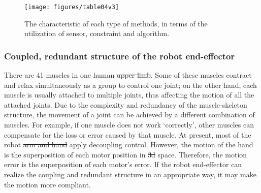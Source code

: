\documentclass[journal,twoside,web]{ieeecolor}
\providecommand{\DIFadd}[1]{{\protect\color{blue}\uwave{#1}}} %
\providecommand{\DIFdel}[1]{{\protect\color{red}\sout{#1}}}                      %
\providecommand{\DIFaddbegin}{} %
\providecommand{\DIFaddend}{} %
\providecommand{\DIFdelbegin}{} %
\providecommand{\DIFdelend}{} %
\newcommand{\DIFscaledelfig}{0.5}
\newlength{\DIFdelgraphicswidth} %
\newlength{\DIFdelgraphicsheight} %
\newcommand{\DIFaddincludegraphics}[2][]{{\color{blue}\fbox{\DIFOincludegraphics[#1]{#2}}}} %
\newcommand{\DIFdelincludegraphics}[2][]{%
\sbox{\DIFdelgraphicsbox}{\DIFOincludegraphics[#1]{#2}}%
\settoboxwidth{\DIFdelgraphicswidth}{\DIFdelgraphicsbox} %
\settoboxtotalheight{\DIFdelgraphicsheight}{\DIFdelgraphicsbox} %
\scalebox{\DIFscaledelfig}{%
\parbox[b]{\DIFdelgraphicswidth}{\usebox{\DIFdelgraphicsbox}\\[-\baselineskip] \rule{\DIFdelgraphicswidth}{0em}}\llap{\resizebox{\DIFdelgraphicswidth}{\DIFdelgraphicsheight}{%
\setlength{\unitlength}{\DIFdelgraphicswidth}%
\begin{picture}(1,1)%
\thicklines\linethickness{2pt} %
{\color[rgb]{1,0,0}\put(0,0){\framebox(1,1){}}}%
{\color[rgb]{1,0,0}\put(0,0){\line( 1,1){1}}}%
{\color[rgb]{1,0,0}\put(0,1){\line(1,-1){1}}}%
\end{picture}%
}\hspace*{3pt}}} %
} %
\DeclareRobustCommand{\DIFaddbegin}{\DIFOaddbegin \let\includegraphics\DIFaddincludegraphics} %
\DeclareRobustCommand{\DIFaddend}{\DIFOaddend \let\includegraphics\DIFOincludegraphics} %
\DeclareRobustCommand{\DIFdelbegin}{\DIFOdelbegin \let\includegraphics\DIFdelincludegraphics} %
\DeclareRobustCommand{\DIFdelend}{\DIFOaddend \let\includegraphics\DIFOincludegraphics} %
\begin{document}

\begin{figure*}[h]
    \centering
    \texttt{[image: figures/table04v3]}
    \caption{The characteristic of each type of methods, in terms of the utilization of sensor, constraint and algorithm.}
    \label{fig:table02}
\end{figure*}

\subsubsection{Coupled, redundant structure of the robot end-effector}

There are 41 muscles in one human \DIFdelbegin \DIFdel{upper limb}\DIFdelend \DIFaddbegin \DIFadd{arm}\DIFaddend . 
Some of these muscles contract and relax simultaneously as a group to control one joint; on the other hand, each muscle is usually attached to multiple joints, thus affecting the motion of all the attached joints.
Due to the complexity and redundancy of the muscle-skeleton structure, the movement of a joint can be achieved by a different combination of muscles.
For example, if one muscle does not work `correctly', other muscles can compensate for the loss or error caused by that muscle. 
At present, most of the robot \DIFdelbegin \DIFdel{arm and hand }\DIFdelend \DIFaddbegin \DIFadd{arms and hands }\DIFaddend apply decoupling control. However, the motion of the hand is the superposition of each motor position in \DIFdelbegin \DIFdel{3d }\DIFdelend \DIFaddbegin \DIFadd{3D }\DIFaddend space. Therefore, the motion error is the superposition of each motor's error. 
If the robot end-effector can realize the coupling and redundant structure in an appropriate way, it may make the motion more compliant. 
\end{document}
